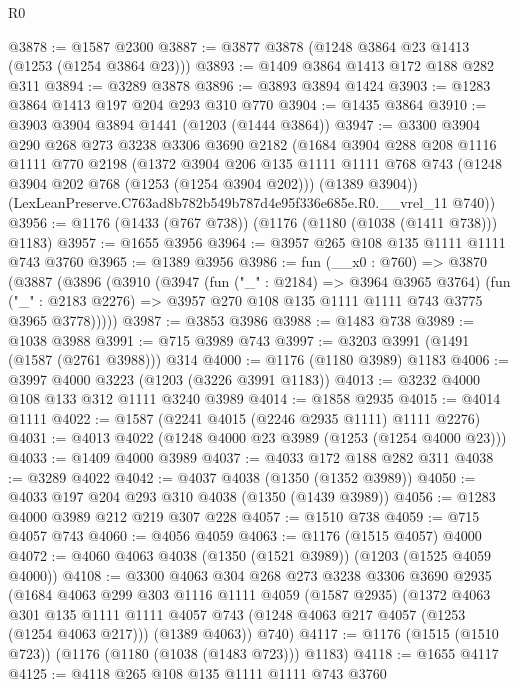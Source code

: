 \begin{lexlean}{R0}
\begin{coremodule}
@3878 := @1587 @2300
@3887 := @3877 @3878 (@1248 @3864 @23 @1413 (@1253 (@1254 @3864 @23)))
@3893 := @1409 @3864 @1413 @172 @188 @282 @311
@3894 := @3289 @3878
@3896 := @3893 @3894 @1424
@3903 := @1283 @3864 @1413 @197 @204 @293 @310 @770
@3904 := @1435 @3864
@3910 := @3903 @3904 @3894 @1441 (@1203 (@1444 @3864))
@3947 := @3300
    @3904
    @290
    @268
    @273
    @3238
    @3306
    @3690
    @2182
    (@1684
      @3904
      @288
      @208
      @1116
      @1111
      @770
      @2198
      (@1372
        @3904
        @206
        @135
        @1111
        @1111
        @768
        @743
        (@1248 @3904 @202 @768 (@1253 (@1254 @3904 @202)))
        (@1389 @3904))
      (LexLeanPreserve.C763ad8b782b549b787d4e95f336e685e.R0.__vrel_11 @740))
@3956 := @1176 (@1433 (@767 @738)) (@1176 (@1180 (@1038 (@1411 @738))) @1183)
@3957 := @1655 @3956
@3964 := @3957 @265 @108 @135 @1111 @1111 @743 @3760
@3965 := @1389 @3956
@3986 := fun (__x0 : @760) =>
  @3870
    (@3887
      (@3896
        (@3910
          (@3947
            (fun ("_" : @2184) => @3964 @3965 @3764)
            (fun ("_" : @2183 @2276) => @3957 @270 @108 @135 @1111 @1111 @743 @3775 @3965 @3778)))))
@3987 := @3853 @3986
@3988 := @1483 @738
@3989 := @1038 @3988
@3991 := @715 @3989 @743
@3997 := @3203 @3991 (@1491 (@1587 (@2761 @3988))) @314
@4000 := @1176 (@1180 @3989) @1183
@4006 := @3997 @4000 @3223 (@1203 (@3226 @3991 @1183))
@4013 := @3232 @4000 @108 @133 @312 @1111 @3240 @3989
@4014 := @1858 @2935
@4015 := @4014 @1111
@4022 := @1587 (@2241 @4015 (@2246 @2935 @1111) @1111 @2276)
@4031 := @4013 @4022 (@1248 @4000 @23 @3989 (@1253 (@1254 @4000 @23)))
@4033 := @1409 @4000 @3989
@4037 := @4033 @172 @188 @282 @311
@4038 := @3289 @4022
@4042 := @4037 @4038 (@1350 (@1352 @3989))
@4050 := @4033 @197 @204 @293 @310 @4038 (@1350 (@1439 @3989))
@4056 := @1283 @4000 @3989 @212 @219 @307 @228
@4057 := @1510 @738
@4059 := @715 @4057 @743
@4060 := @4056 @4059
@4063 := @1176 (@1515 @4057) @4000
@4072 := @4060 @4063 @4038 (@1350 (@1521 @3989)) (@1203 (@1525 @4059 @4000))
@4108 := @3300
    @4063
    @304
    @268
    @273
    @3238
    @3306
    @3690
    @2935
    (@1684
      @4063
      @299
      @303
      @1116
      @1111
      @4059
      (@1587 @2935)
      (@1372
        @4063
        @301
        @135
        @1111
        @1111
        @4057
        @743
        (@1248 @4063 @217 @4057 (@1253 (@1254 @4063 @217)))
        (@1389 @4063))
      @740)
@4117 := @1176 (@1515 (@1510 @723)) (@1176 (@1180 (@1038 (@1483 @723))) @1183)
@4118 := @1655 @4117
@4125 := @4118 @265 @108 @135 @1111 @1111 @743 @3760

\end{coremodule}
\end{lexlean}
